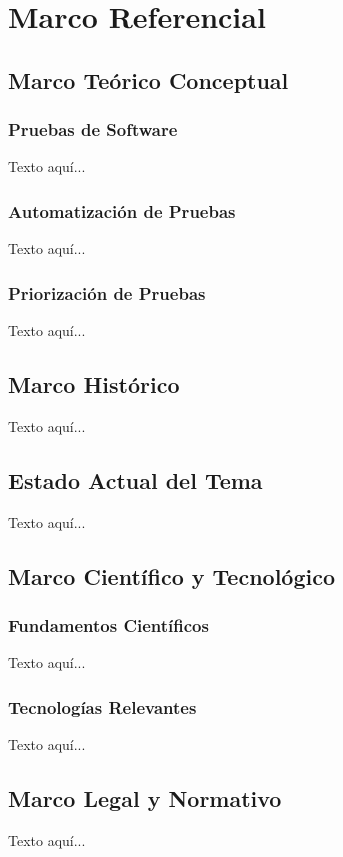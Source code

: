 \documentclass[12pt,letterpaper]{article}
\begin{document}
\section{Marco Referencial}

\subsection{Marco Teórico Conceptual}

\subsubsection{Pruebas de Software}
Texto aquí...

\subsubsection{Automatización de Pruebas}
Texto aquí...

\subsubsection{Priorización de Pruebas}
Texto aquí...

\subsection{Marco Histórico}
Texto aquí...

\subsection{Estado Actual del Tema}
Texto aquí...

\subsection{Marco Científico y Tecnológico}

\subsubsection{Fundamentos Científicos}
Texto aquí...

\subsubsection{Tecnologías Relevantes}
Texto aquí...

\subsection{Marco Legal y Normativo}
Texto aquí... 
\end{document}

